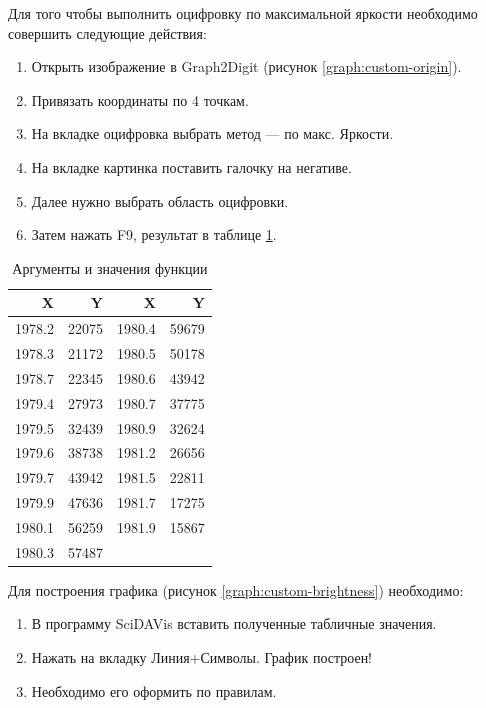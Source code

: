 \documentclass[a4paper,14pt,russian]{report}
\begin{document}
Для того чтобы выполнить оцифровку по максимальной яркости необходимо совершить следующие действия:

\begin{enumerate}
  \item Открыть изображение в Graph2Digit (рисунок \ref{graph:custom-origin}).
  \item Привязать координаты по 4 точкам.
  \item На вкладке оцифровка выбрать метод — по макс. Яркости.
  \item На вкладке картинка поставить галочку на негативе.
  \item Далее нужно выбрать область оцифровки.
  \item Затем нажать F9, результат в таблице \ref{table:custom-brightness}.
\end{enumerate}

\begin{table}[!htb]
\centering
\caption{Аргументы и значения функции}
\label{table:custom-brightness}
\begin{tabular}{|r|r|r|r|}
  \hline
  X & Y & X & Y \\
  \hline
  1978.2 & 22075 & 1980.4 & 59679 \\
  1978.3 & 21172 & 1980.5 & 50178 \\
  1978.7 & 22345 & 1980.6 & 43942 \\
  1979.4 & 27973 & 1980.7 & 37775 \\
  1979.5 & 32439 & 1980.9 & 32624 \\
  1979.6 & 38738 & 1981.2 & 26656 \\
  1979.7 & 43942 & 1981.5 & 22811 \\
  1979.9 & 47636 & 1981.7 & 17275 \\
  1980.1 & 56259 & 1981.9 & 15867 \\
  1980.3 & 57487 & & \\
  \hline
\end{tabular}
\end{table}

Для построения графика (рисунок \ref{graph:custom-brightness}) необходимо:

\begin{enumerate}
  \item В программу SciDAVis вставить полученные табличные значения.
  \item Нажать на вкладку Линия+Символы. График построен!
  \item Необходимо его оформить по правилам.
\end{enumerate}
\end{document}
